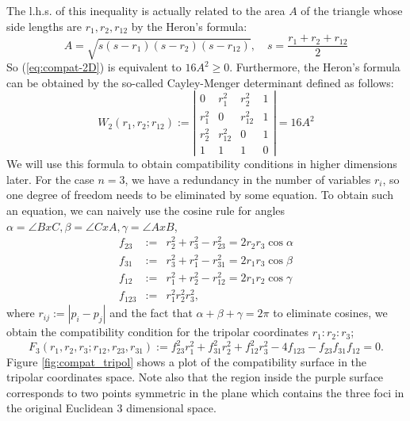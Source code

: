 \documentclass{article}
\begin{document}
The l.h.s. of this inequality is actually related to the area $A$ of the triangle whose side lengths are $r_{1},r_{2},r_{12}$ by the Heron's formula:
\begin{equation}
A = \sqrt{s(s - r_{1})(s-r_{2})(s-r_{12})}, \quad s=\frac{r_1 + r_2 + r_{12}}{2}
\end{equation}
So (\ref{eq:compat-2D}) is equivalent to $16A^{2} \ge 0$. Furthermore, the Heron's formula can be obtained by the so-called Cayley-Menger determinant defined as follows:
\begin{equation}
\label{}
W_2(r_1,r_2;r_{12}) :=   \left|
\begin{array}{cccc}
0 &  r_1^2 & r_2^2 & 1 \\
r_1^2 & 0 & r_{12}^2 & 1\\
r_2^2 & r_{12}^2 & 0 & 1 \\
1 & 1 & 1 & 0
\end{array}\right| = 16A^{2}
\end{equation}
We will use this formula to obtain compatibility conditions in higher dimensions later.
For the case $n=3$, we have a redundancy in the number of variables $r_{i}$, so one degree of freedom needs to be eliminated by some equation.
To obtain such an equation, we can naively use the cosine rule for angles $\alpha = \angle BxC, \beta =\angle CxA, \gamma = \angle AxB$, 
\begin{eqnarray}
f_{23} & := & r_2^2 + r_3^2 - r_{23}^2 = 2r_2r_3\cos{\alpha}\\
f_{31} & := & r_3^2 + r_1^2 - r_{31}^2 = 2r_1r_3\cos{\beta}\\
f_{12} & := & r_1^2 + r_2^2 - r_{12}^2 = 2r_1r_2\cos{\gamma}\\
f_{123} & := & r_1^2 r_2^2 r_3^2,
\end{eqnarray}
where $r_{ij}:=|p_i-p_j|$ and the fact that $\alpha + \beta + \gamma = 2\pi$ to eliminate cosines, we obtain the compatibility condition for the tripolar coordinates $r_{1}:r_{2}:r_{3}$;
\begin{equation}
\label{eq:tri_compat}
F_3(r_1,r_2,r_3;r_{12},r_{23},r_{31}) := f_{23}^2 r_1^2 + f_{31}^2 r_2^2 + f_{12}^2 r_3^2 - 4 f_{123} - f_{23} f_{31} f_{12} = 0.
\end{equation}
Figure \ref{fig:compat_tripol} shows a plot of the compatibility surface in the tripolar coordinates space. Note also that the region inside the purple surface corresponds to two points symmetric in the plane which contains the three foci in the original Euclidean 3 dimensional space. \\
\end{document}
